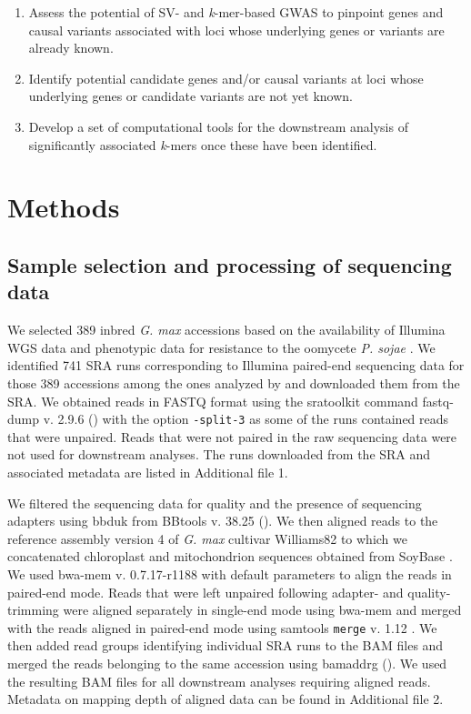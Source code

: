 \begin{enumerate}
	\item Assess the potential of SV- and \emph{k}-mer-based GWAS to
		pinpoint genes and causal variants associated with loci whose
		underlying genes or variants are already known.
	\item Identify potential candidate genes and/or causal variants at loci
		whose underlying genes or candidate variants are not yet known.
	\item Develop a set of computational tools for the downstream analysis
		of significantly associated \emph{k}-mers once these have been
		identified.
\end{enumerate}

\section*{Methods}
\label{sv-gwas-methods}

\subsection*{Sample selection and processing of sequencing data}
\label{sv-gwas-sequencing-data}

We selected 389 inbred \emph{G. max} accessions based on the availability of
Illumina WGS data and phenotypic data for resistance to the oomycete \emph{P.
sojae} \citep{deronne2022}.  We identified 741 SRA runs corresponding to
Illumina paired-end sequencing data for those 389 accessions among the ones
analyzed by \cite{bayer2021} and downloaded them from the SRA.  We obtained
reads in FASTQ format using the sratoolkit command fastq-dump v. 2.9.6
(\citeauthor[][\url{https://github.com/ncbi/sra-tools}]{sratoolkit}) with the
option \texttt{-\-split-3} as some of the runs contained reads that were
unpaired. Reads that were not paired in the raw sequencing data were not used
for downstream analyses.  The runs downloaded from the SRA and associated
metadata are listed in Additional file 1.

We filtered the sequencing data for quality and the presence of sequencing
adapters using bbduk from BBtools v. 38.25
(\citeauthor[][\url{https://sourceforge.net/projects/bbmap/}]{bbtools}). We
then aligned reads to the reference assembly version 4 of \emph{G. max}
cultivar Williams82 \citep{valliyodan2019} to which we concatenated chloroplast
and mitochondrion sequences obtained from SoyBase \citep{grant2010}. We used
bwa-mem v. 0.7.17-r1188 \citep{li2009-bwa} with default parameters to align the
reads in paired-end mode. Reads that were left unpaired following adapter- and
quality-trimming were aligned separately in single-end mode using bwa-mem and
merged with the reads aligned in paired-end mode using samtools \texttt{merge}
v. 1.12 \citep{li2009-samtools}.  We then added read groups identifying
individual SRA runs to the BAM files and merged the reads belonging to the same
accession using bamaddrg
(\citeauthor[][\url{https://github.com/ekg/bamaddrg}]{bamaddrg}). We used the
resulting BAM files for all downstream analyses requiring aligned reads.
Metadata on mapping depth of aligned data can be found in Additional file 2.

